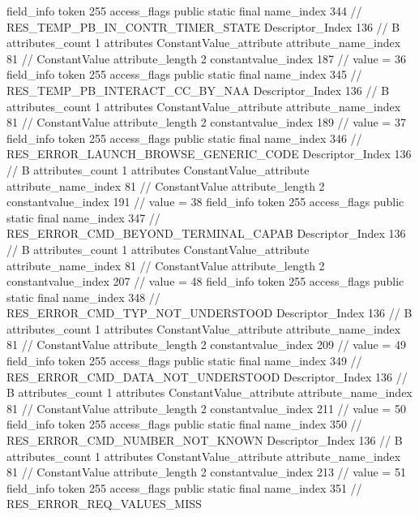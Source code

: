 {{{{{			}
			field_info {
				token	255
				access_flags	public static final
				name_index	344		// RES_TEMP_PB_IN_CONTR_TIMER_STATE
				Descriptor_Index	136		// B
				attributes_count	1
				attributes {
				ConstantValue_attribute {
					attribute_name_index	81		// ConstantValue
					attribute_length	2
					constantvalue_index	187		// value = 36
				}
				}
			}
			field_info {
				token	255
				access_flags	public static final
				name_index	345		// RES_TEMP_PB_INTERACT_CC_BY_NAA
				Descriptor_Index	136		// B
				attributes_count	1
				attributes {
				ConstantValue_attribute {
					attribute_name_index	81		// ConstantValue
					attribute_length	2
					constantvalue_index	189		// value = 37
				}
				}
			}
			field_info {
				token	255
				access_flags	public static final
				name_index	346		// RES_ERROR_LAUNCH_BROWSE_GENERIC_CODE
				Descriptor_Index	136		// B
				attributes_count	1
				attributes {
				ConstantValue_attribute {
					attribute_name_index	81		// ConstantValue
					attribute_length	2
					constantvalue_index	191		// value = 38
				}
				}
			}
			field_info {
				token	255
				access_flags	public static final
				name_index	347		// RES_ERROR_CMD_BEYOND_TERMINAL_CAPAB
				Descriptor_Index	136		// B
				attributes_count	1
				attributes {
				ConstantValue_attribute {
					attribute_name_index	81		// ConstantValue
					attribute_length	2
					constantvalue_index	207		// value = 48
				}
				}
			}
			field_info {
				token	255
				access_flags	public static final
				name_index	348		// RES_ERROR_CMD_TYP_NOT_UNDERSTOOD
				Descriptor_Index	136		// B
				attributes_count	1
				attributes {
				ConstantValue_attribute {
					attribute_name_index	81		// ConstantValue
					attribute_length	2
					constantvalue_index	209		// value = 49
				}
				}
			}
			field_info {
				token	255
				access_flags	public static final
				name_index	349		// RES_ERROR_CMD_DATA_NOT_UNDERSTOOD
				Descriptor_Index	136		// B
				attributes_count	1
				attributes {
				ConstantValue_attribute {
					attribute_name_index	81		// ConstantValue
					attribute_length	2
					constantvalue_index	211		// value = 50
				}
				}
			}
			field_info {
				token	255
				access_flags	public static final
				name_index	350		// RES_ERROR_CMD_NUMBER_NOT_KNOWN
				Descriptor_Index	136		// B
				attributes_count	1
				attributes {
				ConstantValue_attribute {
					attribute_name_index	81		// ConstantValue
					attribute_length	2
					constantvalue_index	213		// value = 51
				}
				}
			}
			field_info {
				token	255
				access_flags	public static final
				name_index	351		// RES_ERROR_REQ_VALUES_MISS
}}}}}
